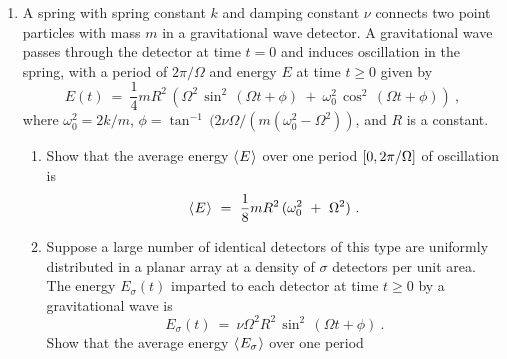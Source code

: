 {\begin{enumerate}[\bfseries 1.]
 a capacitor with capacitance $C$, and a resistor with resistance $R$, is shown in
 the picture on the right. When a switch $s$ in the circuit is opened at time
 $t=0$ the current $I$ through the circuit begins to decrease exponentially as a
 function of time $t$ (measured in seconds after the switch is opened), given by
\[
I ~=~ \frac{E}{R}\,e^{-t/RC}
\]
for $t \ge 0$.
 \begin{enumerate}[\bfseries (a)]
  \item Sketch a rough graph of $I$ as a function of $t$.
  \item Note that at time $t=0$ the current is $I = \frac{E}{R}$ (measured in
   amperes), which is the familiar formula from Ohm's Law. That is the peak
   value of $I$. What is the current $I$ at time $t=5RC$? Write your answer in
   decimal form as a percentage of the peak current $\frac{E}{R}$ (e.g.
   $0.42 \frac{E}{R}$, which would be $42\%$ of the peak current).
  \item Find the average current in the circuit over the time interval
   $\ival{0}{5RC}$. Write your answer in decimal form as a percentage of the
   peak current.
  \end{enumerate}
[{[\bfseries 1.]}]
 \item A spring with spring constant $k$ and damping constant $\nu$ connects
  two point particles with mass $m$ in a gravitational wave detector.
  A gravitational wave passes through the detector at time $t=0$ and induces
  oscillation in the spring, with a period of $2\pi/\Omega$ and energy $E$ at
  time $t \ge 0$ given by
\[
E(t) ~=~ \frac{1}{4}mR^2\,\left(\Omega^2\,\sin^2\,(\Omega t + \phi) ~+~
         \omega_0^2\,\cos^2\,(\Omega t + \phi)\right) ~,
\]
where $\omega_0^2 = 2k/m$, $\phi =
\tan^{-1}\,(2\nu\Omega/(m(\omega_0^2 - \Omega^2))$, and $R$ is a constant.
  \begin{enumerate}[\bfseries (a)]
   \item Show that the average energy $\langle\mspace{1mu}E\mspace{1mu}\rangle$ over one period
    $\lbrack 0,2\pi/\Omega \rbrack$ of oscillation is
\[
\langle\mspace{1mu}E\mspace{1mu}\rangle ~=~ \frac{1}{8}mR^2\,(\omega_0^2 ~+~ \Omega^2) ~.
\]
   \item Suppose a large number of identical detectors of this type are
    uniformly distributed in a planar array at a density of $\sigma$ detectors
    per unit area. The energy $E_\sigma(t)$ imparted to each detector at time
    $t \ge 0$ by a gravitational wave is
\[
E_\sigma(t) ~=~ \nu \Omega^2 R^2\,\sin^2\,(\Omega t + \phi) ~.
\]
Show that the average energy $\langle\mspace{1mu}E_\sigma\mspace{1mu}\rangle$ over one period

\end{enumerate}
\end{enumerate}}
